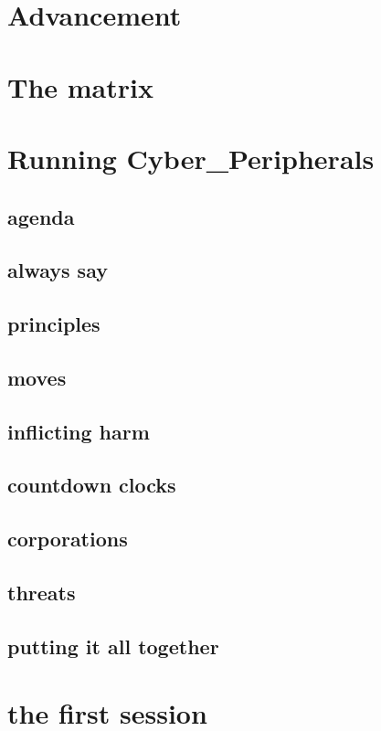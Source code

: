 \documentclass{tufte-book}
\begin{document}
\chapter{Advancement}	\label{ch: advancement}
\chapter{The matrix}	\label{ch: the matrix}
\chapter{Running Cyber\_Peripherals}	\label{ch:running the game}
\section{agenda}			\label{sec: agenda}
\section{always say}		\label{sec: always say}
\section{principles}			\label{sec: principles}
\section{moves}			\label{sec: mcmoves}
\section{inflicting harm}		\label{sec:inflicting harm}
\section{countdown clocks}	\label{sec:countdown clocks}
\section{corporations} 		\label{sec: corporations}
\section{threats}			\label{sec: threats}
\section{putting it all together} 	\label{sec: putting it all together}

\chapter{the first session} \label{ch: the first session}
\end{document}
